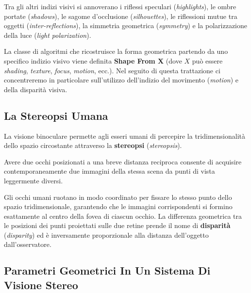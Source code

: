 ﻿\documentclass[11pt, a4paper]{article}
\begin{document}
Tra gli altri indizi visivi si annoverano i riflessi speculari (\emph{highlights}), le ombre portate (\emph{shadows}), le sagome d'occlusione (\emph{silhouettes}), le riflessioni mutue tra oggetti (\emph{inter-reflections}), la simmetria geometrica (\emph{symmetry}) e la polarizzazione della luce (\emph{light polarization}).

La classe di algoritmi che ricostruisce la forma geometrica partendo da uno specifico indizio visivo viene definita \textbf{Shape From X} (dove $X$ può essere \emph{shading}, \emph{texture}, \emph{focus}, \emph{motion}, ecc.). Nel seguito di questa trattazione ci concentreremo in particolare sull'utilizzo dell'indizio del movimento (\emph{motion}) e della disparità visiva.



\subsection{La Stereopsi Umana}

La visione binoculare permette agli esseri umani di percepire la tridimensionalità dello spazio circostante attraverso la \textbf{stereopsi} (\emph{stereopsis}).


Avere due occhi posizionati a una breve distanza reciproca consente di acquisire contemporaneamente due immagini della stessa scena da punti di vista leggermente diversi.


Gli occhi umani ruotano in modo coordinato per fissare lo stesso punto dello spazio tridimensionale, garantendo che le immagini corrispondenti si formino esattamente al centro della fovea di ciascun occhio. La differenza geometrica tra le posizioni dei punti proiettati sulle due retine prende il nome di \textbf{disparità} (\emph{disparity}) ed è inversamente proporzionale alla distanza dell'oggetto dall'osservatore.

\newpage

\subsection{Parametri Geometrici In Un Sistema Di Visione Stereo}
\end{document}
